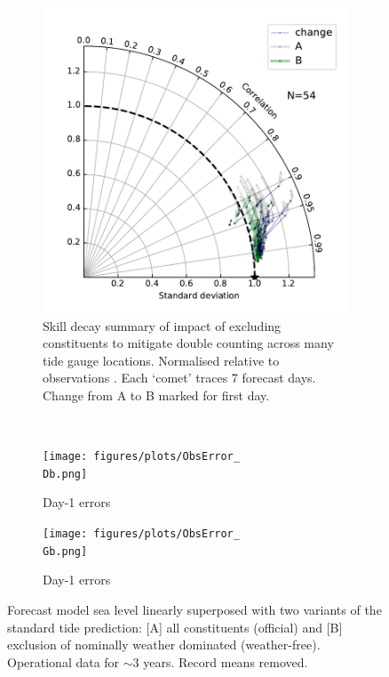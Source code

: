 \begin{figure}[h]\centering
    \begin{subfigure}[b]{\figwidthBig}
        \includegraphics[width=\textwidth]{figures/plots/taylorDoubleCount.pdf}
        \caption{Skill decay summary of impact of excluding constituents to mitigate double counting across many tide gauge locations. Normalised relative to observations \citep{Taylor:2000wp}. Each `comet' traces 7 forecast days.  Change from A to B marked for first day.}   
    \end{subfigure}
    \\
    \begin{subfigure}[b]{\figwidthHalf}
        \texttt{[image: figures/plots/ObsError\_\\Db.png]}
        \caption{Day-1 errors \Dname{}}
    \end{subfigure}
    \begin{subfigure}[b]{\figwidthHalf}
        \texttt{[image: figures/plots/ObsError\_\\Gb.png]}
        \caption{Day-1 errors \Gname{}}
    \end{subfigure}
    
    \caption{Forecast model sea level linearly superposed with two variants of the standard tide prediction: [A] all constituents (official) and [B] exclusion of nominally weather dominated (weather-free).  Operational data for $\sim3$ years. Record means removed.} 
    \label{fig:aggStats}
\end{figure}   


